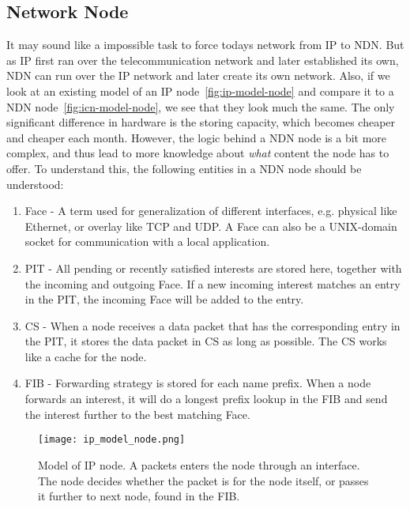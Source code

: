 \subsection{Network Node}
It may sound like a impossible task to force todays network from \gls{IP} to \gls{NDN}. 
But as \gls{IP} first ran over the telecommunication network and later established its own, \gls{NDN} can run over the \gls{IP} network and later create its own network. 
Also, if we look at an existing model of an \gls{IP} node~\autoref{fig:ip-model-node} and compare it to a \gls{NDN} node~\autoref{fig:icn-model-node}, we see that they look much the same.
The only significant difference in hardware is the storing capacity, which becomes cheaper and cheaper each month.
However, the logic behind a \gls{NDN} \gls{node} is a bit more complex, and thus lead to more knowledge about \textit{what} content the node has to offer.
To understand this, the following entities in a \gls{NDN} \gls{node} should be understood:
\begin{enumerate}\label{ndn-node-modules}
  \item Face - A term used for generalization of different interfaces, e.g. physical like Ethernet, or overlay like \gls{TCP} and \gls{UDP}. A Face can also be a UNIX-domain socket for communication with a local application.
  \item \gls{PIT} - All pending or recently satisfied \gls{interest}s are stored here, together with the incoming and outgoing Face.
  If a new incoming \gls{interest} matches an entry in the \gls{PIT}, the incoming Face will be added to the entry. 
  \item \gls{CS} - When a \gls{node} receives a \gls{data} packet that has the corresponding entry in the \gls{PIT}, it stores the \gls{data} packet in \gls{CS} as long as possible. 
  The \gls{CS} works like a cache for the \gls{node}.
  \item \gls{FIB} - Forwarding strategy is stored for each \gls{name} prefix. 
  When a \gls{node} forwards an \gls{interest}, it will do a longest prefix lookup in the \gls{FIB} and send the \gls{interest} further to the best matching Face.
\end{enumerate}

\begin{figure}[H]
  \centering
  \texttt{[image: ip\_model\_node.png]}
  \caption{Model of IP node. A packets enters the node through an interface. 
  The node decides whether the packet is for the node itself, or passes it further to next node, found in the FIB.}
  \label{fig:ip-model-node}
\end{figure}

